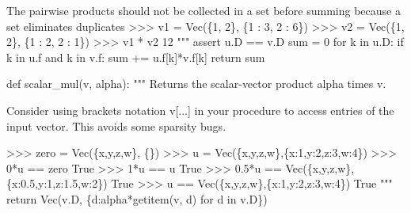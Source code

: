 \documentclass[
  letterpaper,
  DIV=11,
  numbers=noendperiod]{scrartcl}
\newenvironment{Shaded}{\begin{snugshade}}{\end{snugshade}}
\newcommand{\BuiltInTok}[1]{\textcolor[rgb]{0.00,0.23,0.31}{#1}}
\newcommand{\CommentTok}[1]{\textcolor[rgb]{0.37,0.37,0.37}{#1}}
\newcommand{\ControlFlowTok}[1]{\textcolor[rgb]{0.00,0.23,0.31}{#1}}
\newcommand{\DecValTok}[1]{\textcolor[rgb]{0.68,0.00,0.00}{#1}}
\newcommand{\KeywordTok}[1]{\textcolor[rgb]{0.00,0.23,0.31}{#1}}
\newcommand{\NormalTok}[1]{\textcolor[rgb]{0.00,0.23,0.31}{#1}}
\newcommand{\OperatorTok}[1]{\textcolor[rgb]{0.37,0.37,0.37}{#1}}
\begin{document}
\begin{Shaded}
\begin{Highlighting}[numbers=left,,]
\CommentTok{    The pairwise products should not be collected in a set before summing}
\CommentTok{    because a set eliminates duplicates}
\CommentTok{    \textgreater{}\textgreater{}\textgreater{} v1 = Vec(\{1, 2\}, \{1 : 3, 2 : 6\})}
\CommentTok{    \textgreater{}\textgreater{}\textgreater{} v2 = Vec(\{1, 2\}, \{1 : 2, 2 : 1\})}
\CommentTok{    \textgreater{}\textgreater{}\textgreater{} v1 * v2}
\CommentTok{    12}
\CommentTok{    """}
    \ControlFlowTok{assert}\NormalTok{ u.D }\OperatorTok{==}\NormalTok{ v.D}
    \BuiltInTok{sum} \OperatorTok{=} \DecValTok{0}
    \ControlFlowTok{for}\NormalTok{ k }\KeywordTok{in}\NormalTok{ u.D:}
        \ControlFlowTok{if}\NormalTok{ k }\KeywordTok{in}\NormalTok{ u.f }\KeywordTok{and}\NormalTok{ k }\KeywordTok{in}\NormalTok{ v.f:}
            \BuiltInTok{sum} \OperatorTok{+=}\NormalTok{ u.f[k]}\OperatorTok{*}\NormalTok{v.f[k]}
    \ControlFlowTok{return} \BuiltInTok{sum}

\KeywordTok{def}\NormalTok{ scalar\_mul(v, alpha):}
    \CommentTok{"""}
\CommentTok{    Returns the scalar{-}vector product alpha times v.}

\CommentTok{    Consider using brackets notation v[...] in your procedure}
\CommentTok{    to access entries of the input vector.  This avoids some sparsity bugs.}

\CommentTok{    \textgreater{}\textgreater{}\textgreater{} zero = Vec(\{\textquotesingle{}x\textquotesingle{},\textquotesingle{}y\textquotesingle{},\textquotesingle{}z\textquotesingle{},\textquotesingle{}w\textquotesingle{}\}, \{\})}
\CommentTok{    \textgreater{}\textgreater{}\textgreater{} u = Vec(\{\textquotesingle{}x\textquotesingle{},\textquotesingle{}y\textquotesingle{},\textquotesingle{}z\textquotesingle{},\textquotesingle{}w\textquotesingle{}\},\{\textquotesingle{}x\textquotesingle{}:1,\textquotesingle{}y\textquotesingle{}:2,\textquotesingle{}z\textquotesingle{}:3,\textquotesingle{}w\textquotesingle{}:4\})}
\CommentTok{    \textgreater{}\textgreater{}\textgreater{} 0*u == zero}
\CommentTok{    True}
\CommentTok{    \textgreater{}\textgreater{}\textgreater{} 1*u == u}
\CommentTok{    True}
\CommentTok{    \textgreater{}\textgreater{}\textgreater{} 0.5*u == Vec(\{\textquotesingle{}x\textquotesingle{},\textquotesingle{}y\textquotesingle{},\textquotesingle{}z\textquotesingle{},\textquotesingle{}w\textquotesingle{}\},\{\textquotesingle{}x\textquotesingle{}:0.5,\textquotesingle{}y\textquotesingle{}:1,\textquotesingle{}z\textquotesingle{}:1.5,\textquotesingle{}w\textquotesingle{}:2\})}
\CommentTok{    True}
\CommentTok{    \textgreater{}\textgreater{}\textgreater{} u == Vec(\{\textquotesingle{}x\textquotesingle{},\textquotesingle{}y\textquotesingle{},\textquotesingle{}z\textquotesingle{},\textquotesingle{}w\textquotesingle{}\},\{\textquotesingle{}x\textquotesingle{}:1,\textquotesingle{}y\textquotesingle{}:2,\textquotesingle{}z\textquotesingle{}:3,\textquotesingle{}w\textquotesingle{}:4\})}
\CommentTok{    True}
\CommentTok{    """}
    \ControlFlowTok{return}\NormalTok{ Vec(v.D, \{d:alpha}\OperatorTok{*}\NormalTok{getitem(v, d) }\ControlFlowTok{for}\NormalTok{ d }\KeywordTok{in}\NormalTok{ v.D\})}


\end{Highlighting}
\end{Shaded}
\end{document}
